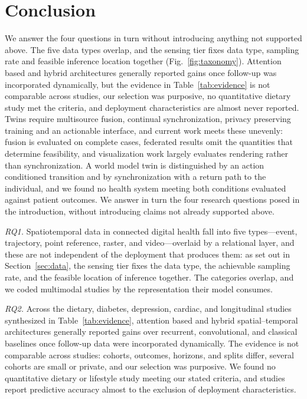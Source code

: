 \documentclass[journal]{IEEEtran}
\newif\ifsubmission
\begin{document}
\section{Conclusion}
\label{sec:conclusion}
\ifsubmission
We answer the four questions in turn without introducing anything not supported above. The five data types overlap, and the sensing tier fixes data type, sampling rate and feasible inference location together (Fig.~\ref{fig:taxonomy}). Attention based and hybrid architectures generally reported gains once follow-up was incorporated dynamically, but the evidence in Table~\ref{tab:evidence} is not comparable across studies, our selection was purposive, no quantitative dietary study met the criteria, and deployment characteristics are almost never reported. Twins require multisource fusion, continual synchronization, privacy preserving training and an actionable interface, and current work meets these unevenly: fusion is evaluated on complete cases, federated results omit the quantities that determine feasibility, and visualization work largely evaluates rendering rather than synchronization. A world model twin is distinguished by an action conditioned transition and by synchronization with a return path to the individual, and we found no health system meeting both conditions evaluated against patient outcomes.
\else
We answer in turn the four research questions posed in the introduction, without introducing claims not already supported above.

\emph{RQ1.} Spatiotemporal data in connected digital health fall into five types---event, trajectory, point reference, raster, and video---overlaid by a relational layer, and these are not independent of the deployment that produces them: as set out in Section~\ref{sec:data}, the sensing tier fixes the data type, the achievable sampling rate, and the feasible location of inference together. The categories overlap, and we coded multimodal studies by the representation their model consumes.

\emph{RQ2.} Across the dietary, diabetes, depression, cardiac, and longitudinal studies synthesized in Table~\ref{tab:evidence}, attention based and hybrid spatial--temporal architectures generally reported gains over recurrent, convolutional, and classical baselines once follow-up data were incorporated dynamically. The evidence is not comparable across studies: cohorts, outcomes, horizons, and splits differ, several cohorts are small or private, and our selection was purposive. We found no quantitative dietary or lifestyle study meeting our stated criteria, and studies report predictive accuracy almost to the exclusion of deployment characteristics.
\end{document}
